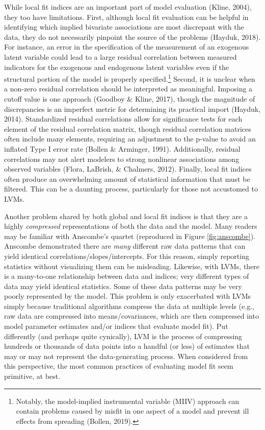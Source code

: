 \documentclass[
  english,
  man]{apa6}
\begin{document}
While local fit indices are an important part of model evaluation (Kline, 2004), they too have limitations. First, although local fit evaluation can be helpful in identifying which implied bivariate associations are most discrepant with the data, they do not necessarily pinpoint the source of the problems (Hayduk, 2018). For instance, an error in the specification of the measurement of an exogenous latent variable could lead to a large residual correlation between measured indicators for the exogenous and endogenous latent variables even if the structural portion of the model is properly specified.\footnote{Notably, the model-implied instrumental variable (MIIV) approach can contain problems caused by misfit in one aspect of a model and prevent ill effects from spreading (Bollen, 2019).} Second, it is unclear when a non-zero residual correlation should be interpreted as meaningful. Imposing a cutoff value is one approach (Goodboy \& Kline, 2017), though the magnitude of discrepancies is an imperfect metric for determining its practical import (Hayduk, 2014). Standardized residual correlations allow for significance tests for each element of the residual correlation matrix, though residual correlation matrices often include many elements, requiring an adjustment to the p-value to avoid an inflated Type I error rate (Bollen \& Arminger, 1991). Additionally, residual correlations may not alert modelers to strong nonlinear associations among observed variables (Flora, LaBrish, \& Chalmers, 2012). Finally, local fit indices often produce an overwhelming amount of statistical information that must be filtered. This can be a daunting process, particularly for those not accustomed to LVMs.

Another problem shared by both global and local fit indices is that they are a highly \emph{compressed} representations of both the data and the model. Many readers may be familiar with Anscombe's quartet (reproduced in Figure \ref{fig:anscombe}). Anscombe demonstrated there are \emph{many} different raw data patterns that can yield identical correlations/slopes/intercepts. For this reason, simply reporting statistics without visualizing them can be misleading. Likewise, with LVMs, there is a many-to-one relationship between data and indices; very different types of data may yield identical statistics. Some of these data patterns may be very poorly represented by the model. This problem is only exacerbated with LVMs simply because traditional algorithms compress the data at multiple levels (e.g., raw data are compressed into means/covariances, which are then compressed into model parameter estimates and/or indices that evaluate model fit). Put differently (and perhaps quite cynically), LVM is the process of compressing hundreds or thousands of data points into a handful (or less) of estimates that may or may not represent the data-generating process. When considered from this perspective, the most common practices of evaluating model fit seem primitive, at best.
\end{document}
